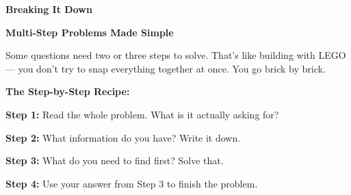 \clearpage
\thispagestyle{empty}
{\sffamily

\begin{center}
{\fontsize{22}{26}\selectfont\bfseries\color{funPink} \faCubes\hspace{3mm}Breaking It Down\hspace{3mm}\faCubes}

\vspace{2mm}
{\color{funGray}\hrulefill}
\end{center}

\vspace{3mm}

\begin{tcolorbox}[
    enhanced,
    colback=funPinkLight,
    colframe=funPink!50,
    arc=10pt,
    boxrule=1.5pt,
    left=6mm, right=6mm, top=5mm, bottom=5mm,
]
{\large\bfseries\color{funPinkDark} \faPuzzlePiece\hspace{2mm}Multi-Step Problems Made Simple}

\vspace{2mm}

Some questions need two or three steps to solve. That's like building with LEGO — you don't try to snap everything together at once. You go brick by brick.

\vspace{3mm}

\textbf{The Step-by-Step Recipe:}

\vspace{2mm}

\textcolor{funPink}{\faArrowDown}\hspace{2mm}\textbf{Step 1:} Read the whole problem. What is it actually asking for?

\vspace{2mm}

\textcolor{funPink}{\faArrowDown}\hspace{2mm}\textbf{Step 2:} What information do you have? Write it down.

\vspace{2mm}

\textcolor{funPink}{\faArrowDown}\hspace{2mm}\textbf{Step 3:} What do you need to find first? Solve that.

\vspace{2mm}

\textcolor{funPink}{\faArrowDown}\hspace{2mm}\textbf{Step 4:} Use your answer from Step 3 to finish the problem.
\end{tcolorbox}

}
